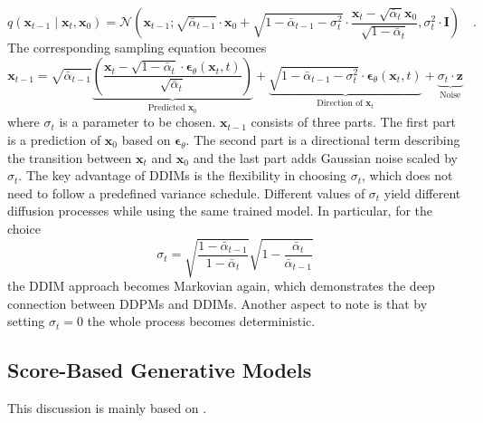 \begin{equation}
q(\mathbf{x}_{t-1} \mid \mathbf{x}_t, \mathbf{x}_0) = 
\mathcal{N} \left( 
\mathbf{x}_{t-1}; 
\sqrt{\bar{\alpha}_{t-1}} \cdot \mathbf{x}_0 + 
\sqrt{1 - \bar{\alpha}_{t-1} - \sigma_t^2} \cdot 
\frac{\mathbf{x}_t - \sqrt{\bar{\alpha}_t} \mathbf{x}_0}{\sqrt{1 - \bar{\alpha}_t}}, 
\sigma_t^2 \cdot \mathbf{I}
\right) \quad.
\end{equation}
The corresponding sampling equation becomes
\begin{equation}
\mathbf{x}_{t-1} = \sqrt{\bar{\alpha}_{t-1}}\underbrace{\left(\frac{\mathbf{x}_t - \sqrt{1 - \bar{\alpha}_t} \cdot \boldsymbol{\epsilon}_\theta(\mathbf{x}_t, t)}{\sqrt{\bar{\alpha}_t}} \right)}_{\text{Predicted } \mathbf{x}_0} + \underbrace{\sqrt{1 - \bar{\alpha}_{t-1} - \sigma_t^2} \cdot \boldsymbol{\epsilon}_\theta(\mathbf{x}_t, t)}_{\text{Direction of } \mathbf{x}_t} + \underbrace{\sigma_t \cdot \mathbf{z}}_{\text{Noise}}
\label{DDIM_Sampler}
\end{equation}
where $\sigma_t$ is a parameter to be chosen. $\mathbf{x}_{t-1}$ consists of three parts. The first part is a prediction of $\mathbf{x}_0$ based on $\boldsymbol{\epsilon}_\theta$. The second part is a directional term describing the transition between $\mathbf{x}_t$ and $\mathbf{x}_0$ and the last part adds Gaussian noise scaled by $\sigma_t$. 
The key advantage of \gls{DDIM}s is the flexibility in choosing $\sigma_t$, which does not need to follow a predefined variance schedule. Different values of $\sigma_t$ yield different diffusion processes while using the same trained model. In particular, for the choice 
\begin{equation}
\sigma_t = \sqrt{\frac{1 - \bar{\alpha}_{t-1}}{1 - \bar{\alpha}_t}} \sqrt{1 - \frac{\bar{\alpha}_t}{\bar{\alpha}_{t-1}}}
\end{equation}
the \gls{DDIM} approach becomes Markovian again, which demonstrates the deep connection between \gls{DDPM}s and \gls{DDIM}s. Another aspect to note is that by setting $\sigma_t = 0$ the whole process becomes deterministic.


\subsection{Score-Based Generative Models}
This discussion is mainly based on \cite{Survey2, SurveyDM}.



